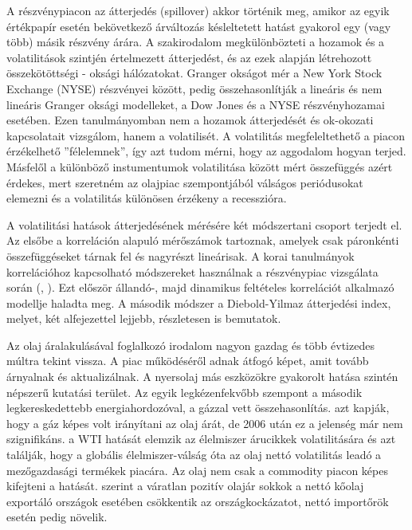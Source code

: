 \documentclass[12pt,bibliography=totoc]{article}
\begin{document}
A részvénypiacon az átterjedés (spillover) akkor történik meg, amikor az egyik értékpapír esetén bekövetkező árváltozás késleltetett hatást gyakorol egy (vagy több) másik részvény árára. A szakirodalom megkülönbözteti a hozamok és a volatilitások szintjén értelmezett átterjedést, és az ezek alapján létrehozott összekötöttségi - oksági hálózatokat. \cite{lee1992causal} Granger okságot mér a New York Stock Exchange (NYSE) részvényei között, \cite{hiemstra1994testing} pedig összehasonlítják a lineáris és nem lineáris Granger oksági modelleket, a Dow Jones és a NYSE részvényhozamai esetében. 
Ezen tanulmányomban nem a hozamok átterjedését és ok-okozati kapcsolatait vizsgálom, hanem a volatilisét. A volatilitás megfeleltethető a piacon érzékelhető ''félelemnek'', így azt tudom mérni, hogy az aggodalom hogyan terjed. Másfelől  a különböző instumentumok volatilitása között mért összefüggés azért érdekes, mert szeretném az olajpiac szempontjából válságos periódusokat elemezni és a volatilitás különösen érzékeny a recesszióra. 


A volatilitási hatások átterjedésének mérésére két módszertani csoport terjedt el. Az elsőbe a korreláción alapuló mérőszámok tartoznak, amelyek csak páronkénti összefüggéseket tárnak fel és nagyrészt lineárisak. A korai tanulmányok korrelációhoz kapcsolható módszereket használnak a részvénypiac vizsgálata során (\cite{king1990transmission}, \cite{lee1993does}). Ezt először \cite{bollerslev1990modelling} állandó-, majd \cite{engle2002dynamic} dinamikus feltételes korrelációt alkalmazó modellje haladta meg. A második módszer a Diebold-Yilmaz átterjedési index, melyet, két alfejezettel lejjebb, részletesen is bemutatok.

Az olaj áralakulásával foglalkozó irodalom nagyon gazdag és több évtizedes múltra tekint vissza. A piac működéséről \cite{alhajji2000opec} adnak átfogó képet, amit \cite{balistreri2010oil} tovább árnyalnak és aktualizálnak. 
A nyersolaj más eszközökre gyakorolt hatása szintén népszerű kutatási terület. Az egyik legkézenfekvőbb szempont a második legkereskedettebb energiahordozóval, a gázzal vett összehasonlítás. \cite{batten2017dynamic} azt kapják, hogy a gáz képes volt irányítani az olaj árát, de 2006 után ez a jelenség már nem szignifikáns. \cite{nazlioglu2013volatility} a WTI hatását elemzik az élelmiszer árucikkek volatilitására és azt találják, hogy a globális élelmiszer-válság óta az olaj nettó volatilitás leadó a mezőgazdasági termékek piacára. Az olaj nem csak a commodity piacon képes kifejteni a hatását. \cite{lee2017dynamic} szerint a váratlan pozitív olajár sokkok a nettó kőolaj exportáló országok esetében csökkentik az országkockázatot, nettó importőrök esetén pedig növelik.
\end{document}
